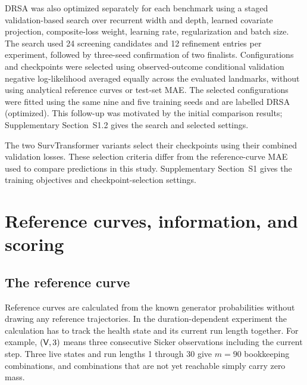 DRSA was also optimized separately for each benchmark using a staged validation-based search over recurrent width and depth, learned covariate projection, composite-loss weight, learning rate, regularization and batch size. The search used 24 screening candidates and 12 refinement entries per experiment, followed by three-seed confirmation of two finalists. Configurations and checkpoints were selected using observed-outcome conditional validation negative log-likelihood averaged equally across the evaluated landmarks, without using analytical reference curves or test-set MAE. The selected configurations were fitted using the same nine and five training seeds and are labelled DRSA (optimized). This follow-up was motivated by the initial comparison results; Supplementary Section~S1.2 gives the search and selected settings.

The two SurvTransformer variants select their checkpoints using their combined validation losses. These selection criteria differ from the reference-curve MAE used to compare predictions in this study. Supplementary Section~S1 gives the training objectives and checkpoint-selection settings.

\section{Reference curves, information, and scoring}\label{sec:truth}
\subsection{The reference curve}
Reference curves are calculated from the known generator probabilities without drawing any reference trajectories. In the duration-dependent experiment the calculation has to track the health state and its current run length together. For example, $(\mathsf V,3)$ means three consecutive Sicker observations including the current step. Three live states and run lengths 1 through 30 give $m=90$ bookkeeping combinations, and combinations that are not yet reachable simply carry zero mass.

